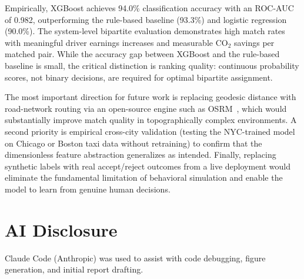 \documentclass{article}
\begin{document}
Empirically, XGBoost achieves 94.0\% classification accuracy with an ROC-AUC of 0.982, outperforming the rule-based baseline (93.3\%) and logistic regression (90.0\%). The system-level bipartite evaluation demonstrates high match rates with meaningful driver earnings increases and measurable CO$_2$ savings per matched pair. While the accuracy gap between XGBoost and the rule-based baseline is small, the critical distinction is ranking quality: continuous probability scores, not binary decisions, are required for optimal bipartite assignment.

The most important direction for future work is replacing geodesic distance with road-network routing via an open-source engine such as OSRM~\citep{hsieh2017car}, which would substantially improve match quality in topographically complex environments. A second priority is empirical cross-city validation (testing the NYC-trained model on Chicago or Boston taxi data without retraining) to confirm that the dimensionless feature abstraction generalizes as intended. Finally, replacing synthetic labels with real accept/reject outcomes from a live deployment would eliminate the fundamental limitation of behavioral simulation and enable the model to learn from genuine human decisions.


\section*{AI Disclosure}
Claude Code (Anthropic) was used to assist with code debugging, figure generation, and initial report drafting. 






\end{document}
